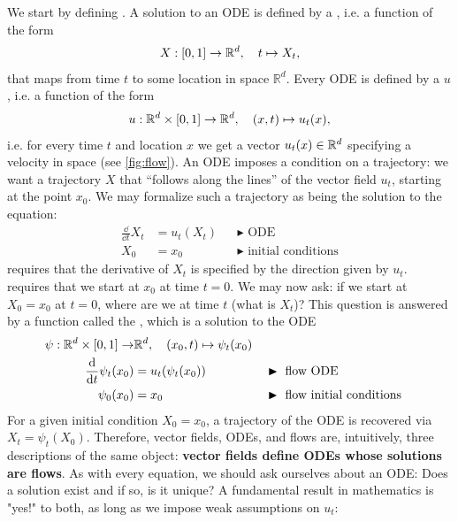 We start by defining . A solution to an ODE is defined by a , i.e. a function of the form
\begin{align*}
X: [0,1] \to \mathbb{R}^d, \quad t \mapsto X_t,
\end{align*}
that maps from time $t$ to some location in space $\mathbb{R}^d$. Every ODE is defined by a  $u$, i.e. a function of the form
\begin{align*}
u:\mathbb{R}^d\times [0,1]\to \mathbb{R}^d,\quad (x,t)\mapsto u_t(x),
\end{align*}
i.e. for every time $t$ and location $x$ we get a vector $u_t(x)\in\mathbb{R}^d$ specifying a velocity in space (see  \cref{fig:flow}). An ODE imposes a condition on a trajectory: we want a trajectory $X$ that ``follows along the lines'' of the vector field $u_t$, starting at the point $x_0$. We may formalize such a trajectory as being the solution to the equation:
\begin{subequations}
    \begin{align} 
      \frac{\dd}{\dd t}X_{t} &= u_t(X_t) &&\blacktriangleright\,\,\text{ODE}\label{e:ode_ode}\\
      X_0&= x_0            &&\blacktriangleright\,\,\text{initial conditions}\label{e:ODE_boundary} 
    \end{align}
\end{subequations}
 requires that the derivative of $X_t$ is specified by the direction given by $u_t$.  requires that we start at $x_0$ at time $t=0$. We may now ask: if we start at $X_0 = x_0$ at $t=0$, where are we at time $t$ (what is $X_t$)? This question is answered by a function called the , which is a solution to the ODE
\begin{subequations}\label{e:flow}
    \begin{align}
    \psi:\mathbb{R}^d\times [0,1]\to& \mathbb{R}^d,\quad (x_0,t)\mapsto \psi_t(x_0)\\
      \frac{\mathrm{d}}{\mathrm{d} t}\psi_{t}(x_0) &= u_t(\psi_{t}(x_0)) &&\blacktriangleright\,\, \text{flow ODE}\label{e:flow_flow}\\
      \psi_{0}(x_0)             &= x_0                &&\blacktriangleright\,\,\text{flow initial conditions}\label{e:flow_boundary} 
    \end{align}
\end{subequations}
For a given initial condition $X_0=x_0$, a trajectory of the ODE is recovered via $X_t = \psi_t(X_0)$. Therefore, vector fields, ODEs, and flows are, intuitively, three descriptions of the same object: \textbf{vector fields define ODEs whose solutions are flows}. As with every equation, we should ask ourselves about an ODE: Does a solution exist and if so, is it unique? A fundamental result in mathematics is "yes!" to both, as long as we impose weak assumptions on $u_t$:

